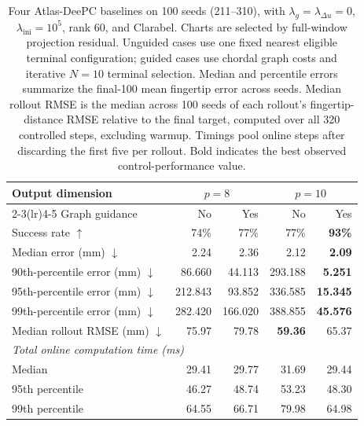 \begin{table}[htbp]
    \centering
    \small
    \begin{tabular}{lrrrr}
        \toprule
        Output dimension & \multicolumn{2}{c}{$p=8$} & \multicolumn{2}{c}{$p=10$} \\
        \cmidrule(lr){2-3}\cmidrule(lr){4-5}
        Graph guidance & No & Yes & No & Yes \\
        \midrule
        Success rate $\uparrow$ & 74\% & 77\% & 77\% & \textbf{93\%} \\
        Median error (mm) $\downarrow$ & 2.24 & 2.36 & 2.12 & \textbf{2.09} \\
        90th-percentile error (mm) $\downarrow$ & 86.660 & 44.113 & 293.188 & \textbf{5.251} \\
        95th-percentile error (mm) $\downarrow$ & 212.843 & 93.852 & 336.585 & \textbf{15.345} \\
        99th-percentile error (mm) $\downarrow$ & 282.420 & 166.020 & 388.855 & \textbf{45.576} \\
        Median rollout RMSE (mm) $\downarrow$ & 75.97 & 79.78 & \textbf{59.36} & 65.37 \\
        \midrule
        \multicolumn{5}{l}{\textit{Total online computation time (ms)}} \\
        Median & 29.41 & 29.77 & 31.69 & 29.44 \\
        95th percentile & 46.27 & 48.74 & 53.23 & 48.30 \\
        99th percentile & 64.55 & 66.71 & 79.98 & 64.98 \\
        \bottomrule
    \end{tabular}
    \caption{Four Atlas-DeePC baselines on 100 seeds (211--310), with
    $\lambda_g=\lambda_{\Delta u}=0$, $\lambda_{\mathrm{ini}}=10^5$, rank 60,
    and Clarabel. Charts are selected by full-window projection residual.
    Unguided cases use one fixed nearest eligible terminal configuration;
    guided cases use chordal graph costs and iterative $N=10$ terminal selection.
    Median and percentile errors summarize the final-100 mean fingertip error
    across seeds. Median rollout RMSE is the median across 100 seeds of
    each rollout's fingertip-distance RMSE relative to the final target,
    computed over all 320 controlled steps, excluding warmup.
    Timings pool online steps after discarding the first
    five per rollout. Bold indicates the best observed control-performance value.}
    \label{tab:four-baselines-no-input-smoothing}
\end{table}
